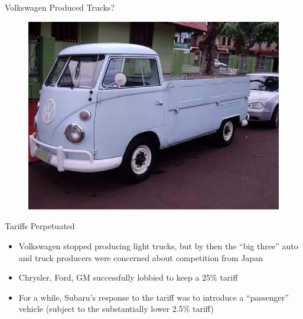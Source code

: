 \documentclass[10pt,hyperref={CJKbookmarks=true},xcolor=dvipsnames,aspectratio=169]{beamer}
\begin{document}
\begin{frame}{Volkswagen Produced Trucks?}


\begin{figure}


\includegraphics[scale=0.4]{fig/instruments/lec07-1}
\end{figure}

\end{frame}

\begin{frame}{Tariffs Perpetuated}

\begin{itemize}
\item Volkswagen stopped producing light trucks, but by then the “big three”
auto and truck producers were concerned about competition from Japan 
\item Chrysler, Ford, GM successfully lobbied to keep a 25\% tariff 
\item For a while, Subaru’s response to the tariff was to introduce a “passenger”
vehicle (subject to the substantially lower 2.5\% tariff)
\end{itemize}
\end{frame}
\end{document}
